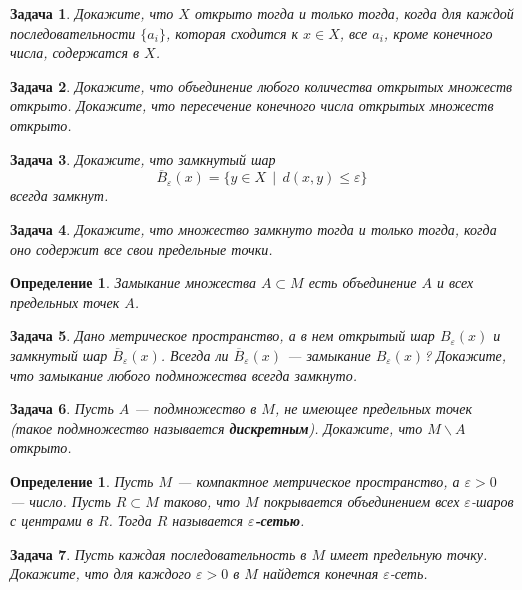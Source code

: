 \documentclass[12pt]{book}
\renewcommand{\epsilon}{\varepsilon}
\theoremstyle{upshape}
\newtheorem{zadacha}{Задача}[chapter]
\theoremstyle{generic}
\newtheorem{opredelenie}[teorema]{Определение}
\theoremstyle{upshapenonumber}
\newcommand{\следствие}{%
     \refstepcounter{teorema}
     {\noindent\bf Следствие \thechapter.\arabic{teorema}:\ }}
\newcommand{\пример}{%
     \refstepcounter{teorema}
     {\noindent\bf Пример \thechapter.\arabic{teorema}:\ }}
\newcommand{\лемма}{%
     \refstepcounter{teorema}
     {\noindent\bf Лемма \thechapter.\arabic{teorema}:\ }}
\newcommand{\теорема}{%
     \refstepcounter{teorema}
     {\noindent\bf Теорема \thechapter.\arabic{teorema}:\ }}
\newcommand{\утверждение}{%
     \refstepcounter{teorema}
     {\noindent\bf Утверждение \thechapter.\arabic{teorema}:\ }}
\begin{document}
{\begin{zadacha} Докажите, что $X$ открыто тогда и только тогда, когда
для каждой последовательности $\{a_i\}$, которая сходится к $x\in
X$, все $a_i$, кроме конечного числа, содержатся в $X$.
\end{zadacha}

\begin{zadacha} Докажите, что объединение любого количества
открытых множеств открыто. Докажите, что пересечение конечного числа
открытых множеств открыто.
\end{zadacha}

\begin{zadacha} Докажите, что замкнутый шар 
$$ 
\overline B_\epsilon(x) = \{ y \in X \ \ | \ \ d(x,y)\leq \epsilon\}
$$
всегда замкнут. 
\end{zadacha}

\begin{zadacha} Докажите, что множество замкнуто тогда и только
тогда, когда оно содержит все свои предельные точки.
\end{zadacha}

\begin{opredelenie} Замыкание множества $A\subset M$ 
есть объединение $A$ и всех предельных точек $A$.
\end{opredelenie}

\begin{zadacha} 
Дано метрическое пространство, а в нем 
открытый шар $B_\epsilon(x)$ и замкнутый шар
$\overline B_\epsilon(x)$. Всегда ли $\overline B_\epsilon(x)$ --- замыкание
$B_\epsilon(x)$? Докажите, что замыкание любого 
подмножества всегда замкнуто.
\end{zadacha}

\begin{zadacha} \label{_DISKRE_Zadacha_}
Пусть $A$ --- подмножество в $M$, 
не имеющее предельных точек (такое подмножество называется {\bf
дискретным}). Докажите, что $M \backslash A$ открыто.
\end{zadacha}

\begin{opredelenie} Пусть $M$ --- компактное метрическое
пространство, а $\epsilon > 0$ --- число.  Пусть $R\subset M$ таково,
что $M$ покрывается объединением всех $\epsilon$-шаров с центрами в
$R$. Тогда $R$ называется {\bf $\epsilon$-сетью}.
\end{opredelenie}

\begin{zadacha} Пусть каждая последовательность
в $M$ имеет предельную точку. Докажите, что 
для каждого $\epsilon >0$ в $M$ найдется конечная $\epsilon$-сеть.
\end{zadacha}

}
\end{document}
